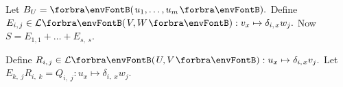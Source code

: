 Let $B_U=\Par{u_1,\dots,u_m}.$ Define $E_{i,\;\!j}\in\Lm{V,W}:v_x\mapsto\delta_{i,\;\!x}w_j.$ Now $S=E_{1,1}+\dots+E_{s,\;\!s}.$\par\vspace{0pt}\quad%
Define $R_{i,\;\!j}\in\Lm{U,V}:u_x\mapsto\delta_{i,\;\!x}v_j.$ \;Let $E_{k,\;\!j}R_{i,\;\!k}=Q_{i,\;\!j}:u_x\mapsto\delta_{i,\;\!x}w_j.$\par\vspace{-20pt}\quad
